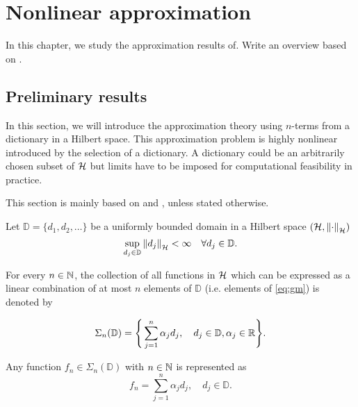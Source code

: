 \chapter{Nonlinear approximation}
\label{ch:preliminary}

In this chapter, we study the approximation results of. 
Write an overview based on \cite{devore_1998,pinkusApproximationTheoryMLP1999}.

\section{Preliminary results}
\label{sec:preliminary}





In this section, we will introduce the approximation theory using $n$-terms from
a dictionary in a Hilbert space. This approximation problem is highly nonlinear
introduced by the selection of a dictionary. A dictionary could be an
arbitrarily chosen subset of $\mathcal{H}$ but limits have to be imposed for
computational feasibility in practice. 

This section is mainly based on \cite[Chapter 8]{devore_1998} and
\cite{vandervaartWeakConvergenceEmpirical1996}, unless stated otherwise.

Let $\mathbb{D} = \{d_1,d_2,\dots\}$ be a uniformly bounded domain in a Hilbert
space $(\mathcal{H}, \left\| \cdot \right\|_{\mathcal{H}})$
\begin{equation}
    \sup_{d_j\in \mathbb{D}} \left\| d_j \right\|_{\mathcal{H}} < \infty \quad 
    \forall d_j \in \mathbb{D}.
\end{equation}

For every $n \in \mathbb{N}$, the collection of all functions in $\mathcal{H}$
which can be expressed as a linear combination of at most $n$ elements of
$\mathbb{D}$ (i.e. elements of \eqref{eq:gm}) is denoted by

\begin{equation}
    \label{eq:dict_represent}
    \Sigma_n(\mathbb{D}) = \Bigg\{
        \sum_{j=1}^n \alpha_j d_j, \quad
        d_j \in \mathbb{D}, \alpha_j \in \mathbb{R}
    \Bigg\}.
\end{equation}

Any function $f_n \in \Sigma_n(\mathbb{D})$ with $n \in \mathbb{N}$ is represented as
\begin{equation}
    \label{eq:gm}
    f_n = \sum_{j=1}^n \alpha_j d_j, \quad d_j \in \mathbb{D}.
\end{equation}

